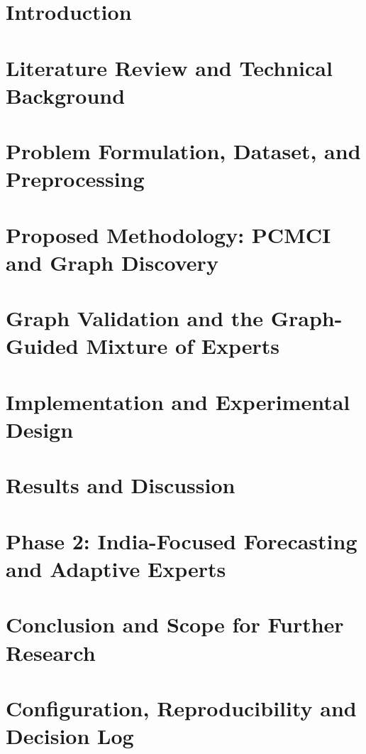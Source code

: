 \documentclass[a4paper, 12pt]{report}
\begin{document}
\clearpage
{}
\setcounter{page}{1}
\pagestyle{fancy}
\chapter{Introduction}

\chapter{Literature Review and Technical Background}

\chapter{Problem Formulation, Dataset, and Preprocessing}

\chapter{Proposed Methodology: PCMCI and Graph Discovery}

\chapter{Graph Validation and the Graph-Guided Mixture of Experts}

\chapter{Implementation and Experimental Design}

\chapter{Results and Discussion}

\chapter{Phase 2: India-Focused Forecasting and Adaptive Experts}

\chapter{Conclusion and Scope for Further Research}


\appendix
\chapter{Configuration, Reproducibility and Decision Log}

\end{document}
